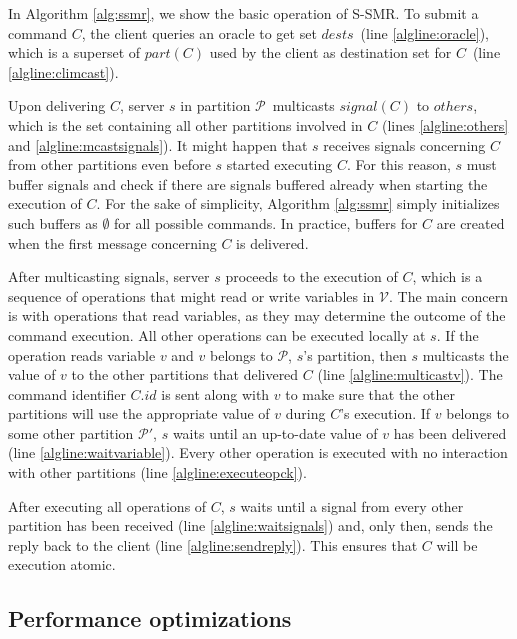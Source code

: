 \documentclass[10pt, conference, compsocconf, letterpaper]{IEEEtranv17}
\newcommand{\pp}{$\mathcal{P}$}
\newcommand{\ppm}{\mathcal{P}}
\newcommand{\vv}{$\mathcal{V}$}
\begin{document}
In Algorithm \ref{alg:ssmr}, we show the basic operation of S-SMR. 
To submit a command $C$, the client queries an oracle to get set $dests$~(line \ref{algline:oracle}), which is a superset of $part(C)$ used by the client as destination set for $C$~(line \ref{algline:climcast}).

Upon delivering $C$, server $s$ in partition \pp\ multicasts $signal(C)$ to $others$, which is the set containing all other partitions involved in $C$ (lines \ref{algline:others} and \ref{algline:mcastsignals}). 
It might happen that $s$ receives signals concerning $C$ from other partitions even before $s$ started executing $C$. For this reason, $s$ must buffer signals and check if there are signals buffered already when starting the execution of $C$. For the sake of simplicity, Algorithm \ref{alg:ssmr} simply initializes such buffers as $\emptyset$ for all possible commands. In practice, buffers for $C$ are created when the first message concerning $C$ is delivered.

After multicasting signals, server $s$ proceeds to the execution of $C$, which is a sequence of operations that might read or write variables in \vv. The main concern is with operations that read variables, as they may determine the outcome of the command execution. All other operations can be executed locally at $s$. If the operation reads variable $v$ and $v$ belongs to \pp, $s$'s partition, then $s$ multicasts the value of $v$ to the other partitions that delivered $C$ (line \ref{algline:multicastv}). The command identifier $C.id$ is sent along with $v$ to make sure that the other partitions will use the appropriate value of $v$ during $C$'s execution. If $v$ belongs to some other partition $\ppm'$, $s$ waits until an up-to-date value of $v$ has been delivered (line \ref{algline:waitvariable}). Every other operation is executed with no interaction with other partitions (line \ref{algline:executeopck}).

After executing all operations of $C$, $s$ waits until a signal from every other partition has been received (line \ref{algline:waitsignals}) and, only then, sends the reply back to the client (line \ref{algline:sendreply}). This ensures that $C$ will be execution atomic.



\subsection{Performance optimizations}
\label{sec:optm}
\end{document}
